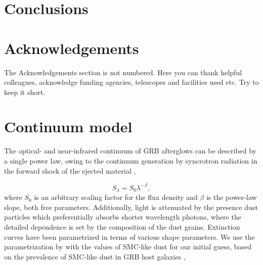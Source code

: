 \documentclass[a4paper,fleqn,usenatbib]{mnras}
\begin{document}
\section{Conclusions}



\section*{Acknowledgements}

The Acknowledgements section is not numbered. Here you can thank helpful
colleagues, acknowledge funding agencies, telescopes and facilities used etc.
Try to keep it short.









\newpage
\appendix

\section{Continuum model}
The optical- and near-infrared continuum of GRB afterglows can be described by a single power law, owing to the continuum generation by syncrotron radiation in the forward shock of the ejected material \citep{Piran2004, Kumar2015},

\begin{equation} 
S_\lambda = S_{0} \lambda^{-\beta},
\end{equation}
where $S_0$ is an arbitrary scaling factor for the flux density and $\beta$ is the power-law slope, both free parameters. 
Additionally, light is attenuated by the presence dust particles which preferentially absorbs shorter wavelength photons, where the detailed dependence is set by the composition of the dust grains. Extinction curves have been parametrized in terms of various shape parameters. We use the parametrization by \citet{Fitzpatrick2007} with the values of SMC-like dust \citep{Gordon2003} for our initial guess, based on the prevalence of SMC-like dust in GRB host galaxies \citep{Japelj2015},
\end{document}
